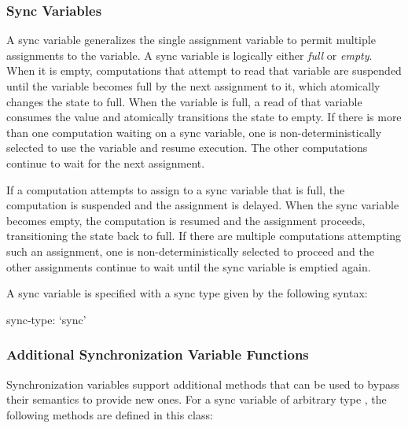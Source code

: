 \subsubsection{Sync Variables}
\label{Sync_Variables}

A sync variable generalizes the single assignment variable to permit
multiple assignments to the variable. A sync variable is logically
either {\em full} or {\em empty}. When it is empty, computations that
attempt to read that variable are suspended until the variable becomes
full by the next assignment to it, which atomically changes the state
to full. When the variable is full, a read of that variable consumes
the value and atomically transitions the state to empty. If there is
more than one computation waiting on a sync variable, one is
non-deterministically selected to use the variable and resume
execution.  The other computations continue to wait for the next
assignment.

If a computation attempts to assign to a sync variable that is full,
the computation is suspended and the assignment is delayed. When the
sync variable becomes empty, the computation is resumed and the
assignment proceeds, transitioning the state back to full. If there
are multiple computations attempting such an assignment, one is
non-deterministically selected to proceed and the other assignments
continue to wait until the sync variable is emptied again.

A sync variable is specified with a sync type given by the following
syntax:
\begin{syntax}
sync-type:
  `sync'
\end{syntax}

\subsubsection{Additional Synchronization Variable Functions}
\label{Functions_on_Synchronization_Variables}

Synchronization variables support additional methods that
can be used to bypass their semantics to provide new ones.
For a sync variable  of arbitrary type ,
the following methods are defined in this class:

